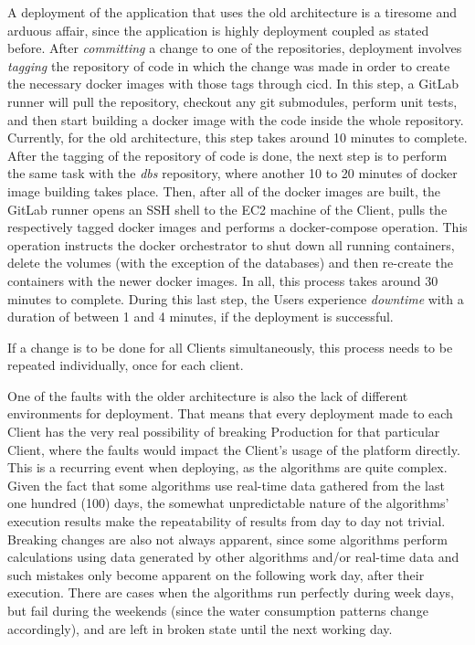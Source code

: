A deployment of the application that uses the old architecture is a tiresome and arduous affair, since the application is highly deployment coupled as stated before. After \textit{committing} a change to one of the repositories, deployment involves \textit{tagging} the repository of code in which the change was made in order to create the necessary docker images with those tags through \gls{cicd}. In this step, a GitLab runner will pull the repository, checkout any git submodules, perform unit tests, and then start building a docker image with the code inside the whole repository. Currently, for the old architecture, this step takes around 10 minutes to complete. After the tagging of the repository of code is done, the next step is to perform the same task with the \textit{dbs} repository, where another 10 to 20 minutes of docker image building takes place. Then, after all of the docker images are built, the GitLab runner opens an SSH shell to the EC2 machine of the Client, pulls the respectively tagged docker images and performs a docker-compose operation. This operation instructs the docker orchestrator to shut down all running containers, delete the volumes (with the exception of the databases) and then re-create the containers with the newer docker images. In all, this process takes around 30 minutes to complete. During this last step, the Users experience \textit{downtime} with a duration of between 1 and 4 minutes, if the deployment is successful.

If a change is to be done for all Clients simultaneously, this process needs to be repeated individually, once for each client. 

One of the faults with the older architecture is also the lack of different environments for deployment. That means that every deployment made to each Client has the very real possibility of breaking Production for that particular Client, where the faults would impact the Client's usage of the platform directly. This is a recurring event when deploying, as the algorithms are quite complex. Given the fact that some algorithms use real-time data gathered from the last one hundred (100) days, the somewhat unpredictable nature of the algorithms' execution results make the repeatability of results from day to day not trivial.
Breaking changes are also not always apparent, since some algorithms perform calculations using data generated by other algorithms and/or real-time data and such mistakes only become apparent on the following work day, after their execution. There are cases when the algorithms run perfectly during week days, but fail during the weekends (since the water consumption patterns change accordingly), and are left in broken state until the next working day.

